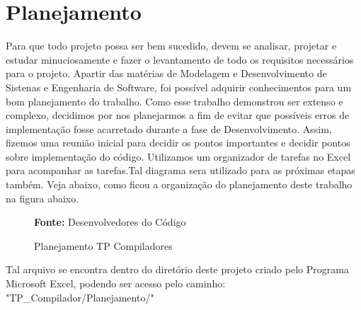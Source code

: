 \chapter{Planejamento}
Para que todo projeto possa ser bem sucedido, devem se analisar, projetar e estudar minuciosamente e fazer o levantamento de todo os requisitos necessários para o projeto.
Apartir das matérias de Modelagem e Desenvolvimento de Sistenas e Engenharia de Software, foi possível adquirir conhecimentos para um bom planejamento do trabalho.
Como esse trabalho demonstrou ser extenso e complexo, decidimos por nos planejarmos a fim de evitar que possíveis erros de implementação fosse acarretado durante a fase de Desenvolvimento.
Assim, fizemos uma reunião inicial para decidir os pontos importantes e decidir pontos sobre implementação do código.
Utilizamos um organizador de tarefas no Excel para acompanhar as tarefas.Tal diagrama sera utilizado para as próximas etapas também.
Veja abaixo, como ficou a organização do planejamento deste trabalho na figura abaixo.

\begin{figure}[H]
    \vspace{1.0em}
    \centering
    \caption{Planejamento TP Compiladores}
 
    \hspace{\linewidth}%
    \textbf{Fonte:} Desenvolvedores do Código
    \label{fig:cefets}
    \vspace{1.0em}
\end{figure}
Tal arquivo se encontra dentro do diretório deste projeto criado pelo Programa Microsoft Excel, podendo ser acesso pelo caminho: "TP{\_}Compilador/Planejamento/"